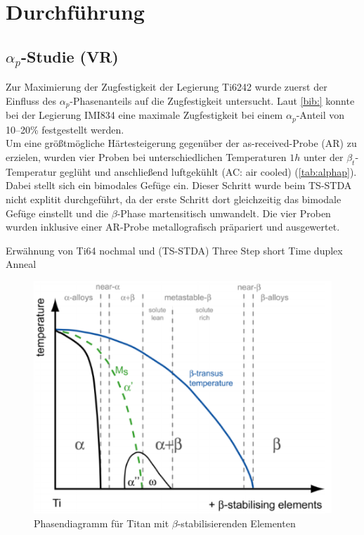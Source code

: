 \chapter{Durchführung}

\section{$\alpha_p$-Studie (VR)}
Zur Maximierung der Zugfestigkeit der Legierung Ti6242 wurde zuerst der Einfluss des $\alpha_p$-Phasenanteils auf die Zugfestigkeit untersucht. Laut \ref{bib:} konnte bei der Legierung IMI834 eine maximale Zugfestigkeit bei einem $\alpha_p$-Anteil von 10--20\% festgestellt werden. \\
Um eine größtmögliche Härtesteigerung gegenüber der as-received-Probe (AR) zu erzielen, wurden vier Proben bei unterschiedlichen Temperaturen $1h$ unter der $\beta_t$-Temperatur geglüht und anschließend luftgekühlt (AC: air cooled) (\ref{tab:alphap}). Dabei stellt sich ein bimodales Gefüge ein. Dieser Schritt wurde beim TS-STDA nicht explitit durchgeführt, da der erste Schritt dort gleichzeitig das bimodale Gefüge einstellt und die $\beta$-Phase martensitisch umwandelt. Die vier Proben wurden inklusive einer AR-Probe metallografisch präpariert und ausgewertet.

Erwähnung von Ti64 nochmal und (TS-STDA) Three Step short Time duplex Anneal


\begin{figure}[h]
	\includegraphics{Bilder/Phasendiagramm_beta.png}
	\caption{Phasendiagramm für Titan mit $\beta$-stabilisierenden Elementen}
	\label{fig:phadia}
\end{figure}



